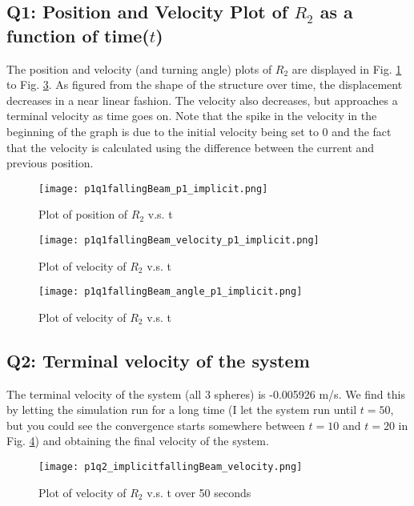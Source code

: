 \documentclass[letterpaper, 10 pt, conference]{ieeeconf}  %
\begin{document}
\subsection*{Q1: Position and Velocity Plot of $R_2$  as a function of time($t$)}

The position and velocity (and turning angle) plots of $R_2$ are displayed in Fig. \ref{"fig:p1q1_position"} to Fig. \ref{"fig:p1q1_angle"}. As figured from the shape of the structure over time, the displacement decreases in a near linear fashion. The velocity also decreases, but approaches a terminal velocity as time goes on. Note that the spike in the velocity in the beginning of the graph is due to the initial velocity being set to 0 and the fact that the velocity is calculated using the difference between the current and previous position.

\begin{figure}[!ht]
        \centering
        \texttt{[image: p1q1fallingBeam\_p1\_implicit.png]}
        \caption{Plot of position of $R_2$ v.s. t}
        \label{"fig:p1q1_position"}
\end{figure}

\begin{figure}[!ht]
        \centering
        \texttt{[image: p1q1fallingBeam\_velocity\_p1\_implicit.png]}
        \caption{Plot of velocity of $R_2$ v.s. t}
        \label{"fig:p1q1_velocity"}
\end{figure}

\begin{figure}[!ht]
        \centering
        \texttt{[image: p1q1fallingBeam\_angle\_p1\_implicit.png]}
        \caption{Plot of velocity of $R_2$ v.s. t}
        \label{"fig:p1q1_angle"}
\end{figure}


\subsection*{ Q2: Terminal velocity of the system}

The terminal velocity of the system (all 3 spheres) is -0.005926 m/s. We find this by letting the simulation run for a long time (I let the system run until $t=50$, but you could see the convergence starts somewhere between $t=10$ and $t=20$ in Fig. \ref{"fig:p1q2_term_velocity"}) and obtaining the final velocity of the system.

\begin{figure}[!ht]
        \centering
        \texttt{[image: p1q2\_implicitfallingBeam\_velocity.png]}
        \caption{Plot of velocity of $R_2$ v.s. t over 50 seconds}
        \label{"fig:p1q2_term_velocity"}
\end{figure}
\end{document}
